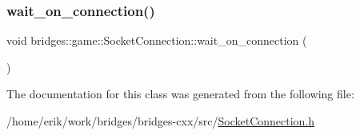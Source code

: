 \subsubsection{\texorpdfstring{wait\+\_\+on\+\_\+connection()}{wait\_on\_connection()}}
{\footnotesize\ttfamily void bridges\+::game\+::\+Socket\+Connection\+::wait\+\_\+on\+\_\+connection (\begin{DoxyParamCaption}{ }\end{DoxyParamCaption})\hspace{0.3cm}{\ttfamily [inline]}}



The documentation for this class was generated from the following file\+:\begin{DoxyCompactItemize}
\item 
/home/erik/work/bridges/bridges-\/cxx/src/\hyperlink{_socket_connection_8h}{Socket\+Connection.\+h}\end{DoxyCompactItemize}
